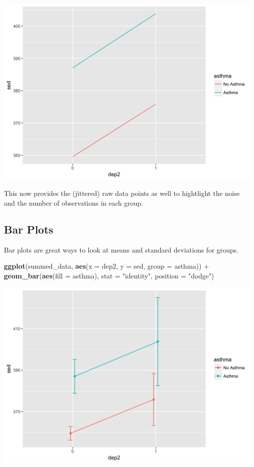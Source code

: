 \documentclass[]{tufte-book}
\newenvironment{Shaded}{}{}
\newcommand{\KeywordTok}[1]{\textcolor[rgb]{0.00,0.44,0.13}{\textbf{#1}}}
\newcommand{\DataTypeTok}[1]{\textcolor[rgb]{0.56,0.13,0.00}{#1}}
\newcommand{\StringTok}[1]{\textcolor[rgb]{0.25,0.44,0.63}{#1}}
\newcommand{\OperatorTok}[1]{\textcolor[rgb]{0.40,0.40,0.40}{#1}}
\newcommand{\NormalTok}[1]{#1}
\theoremstyle{definition}
\theoremstyle{definition}
\theoremstyle{remark}
\begin{document}
\includegraphics{_main_files/figure-latex/unnamed-chunk-142-1}

This now provides the (jittered) raw data points as well to hightlight
the noise and the number of observations in each group.

\subsection*{Bar Plots}\label{bar-plots}

Bar plots are great ways to look at means and standard deviations for
groups.

\begin{Shaded}
\begin{Highlighting}[]
\KeywordTok{ggplot}\NormalTok{(summed_data, }\KeywordTok{aes}\NormalTok{(}\DataTypeTok{x =}\NormalTok{ dep2, }\DataTypeTok{y =}\NormalTok{ sed, }\DataTypeTok{group =}\NormalTok{ asthma)) }\OperatorTok{+}\StringTok{ }
\StringTok{    }\KeywordTok{geom_bar}\NormalTok{(}\KeywordTok{aes}\NormalTok{(}\DataTypeTok{fill =}\NormalTok{ asthma), }\DataTypeTok{stat =} \StringTok{"identity"}\NormalTok{, }
        \DataTypeTok{position =} \StringTok{"dodge"}\NormalTok{)}
\end{Highlighting}
\end{Shaded}

\includegraphics{_main_files/figure-latex/unnamed-chunk-143-1}
\end{document}
